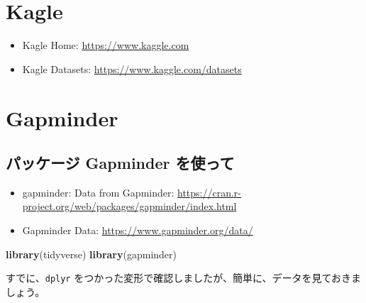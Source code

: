 \documentclass[
  xelatex, ja=standard]{bxjsbook}
\newenvironment{Shaded}{\begin{snugshade}}{\end{snugshade}}
\newcommand{\FunctionTok}[1]{\textcolor[rgb]{0.13,0.29,0.53}{\textbf{#1}}}
\newcommand{\NormalTok}[1]{#1}
\theoremstyle{definition}
\theoremstyle{definition}
\theoremstyle{definition}
\theoremstyle{definition}
\theoremstyle{remark}
\begin{document}
\hypertarget{kagle}{%
\section{Kagle}\label{kagle}}

\begin{itemize}
\item
  Kagle Home: \url{https://www.kaggle.com}
\item
  Kagle Datasets: \url{https://www.kaggle.com/datasets}
\end{itemize}

\hypertarget{gapminder-1}{%
\section{Gapminder}\label{gapminder-1}}

\hypertarget{ux30d1ux30c3ux30b1ux30fcux30b8-gapminder-ux3092ux4f7fux3063ux3066}{%
\subsection{パッケージ Gapminder を使って}\label{ux30d1ux30c3ux30b1ux30fcux30b8-gapminder-ux3092ux4f7fux3063ux3066}}

\begin{itemize}
\item
  gapminder: Data from Gapminder: \url{https://cran.r-project.org/web/packages/gapminder/index.html}
\item
  Gapminder Data: \url{https://www.gapminder.org/data/}
\end{itemize}

\begin{Shaded}
\begin{Highlighting}[]
\FunctionTok{library}\NormalTok{(tidyverse)}
\FunctionTok{library}\NormalTok{(gapminder)}
\end{Highlighting}
\end{Shaded}

すでに、\texttt{dplyr} をつかった変形で確認しましたが、簡単に、データを見ておきましょう。
\end{document}
